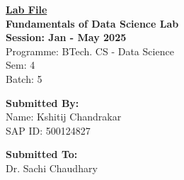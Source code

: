 
\begin{titlepage}
\centering
{\Huge \underline{\textbf{Lab File}}} \\[0.7cm]
{\Large \textbf{Fundamentals of Data Science Lab}} \\[0.5cm]
{\large \textbf{Session: Jan - May 2025}} \\[0.5cm]  %
{\large Programme: BTech. CS - Data Science} \\[0.5cm]  %
{\large Sem: 4} \\  %
{\large Batch: 5}  %

\vfill
\begin{center}
      \begin{minipage}[t][3cm][t]{0.45\textwidth}  %
        \textbf{Submitted By:} \\[0.15cm]
        Name: Kshitij Chandrakar \\
        SAP ID: 500124827
    \end{minipage}
    \hfill
      \begin{minipage}[t][3cm][t]{0.45\textwidth}  %
        \raggedleft  %
        \textbf{Submitted To:} \\[0.15cm]
        Dr. Sachi Chaudhary
    \end{minipage}
\end{center}
\end{titlepage}
